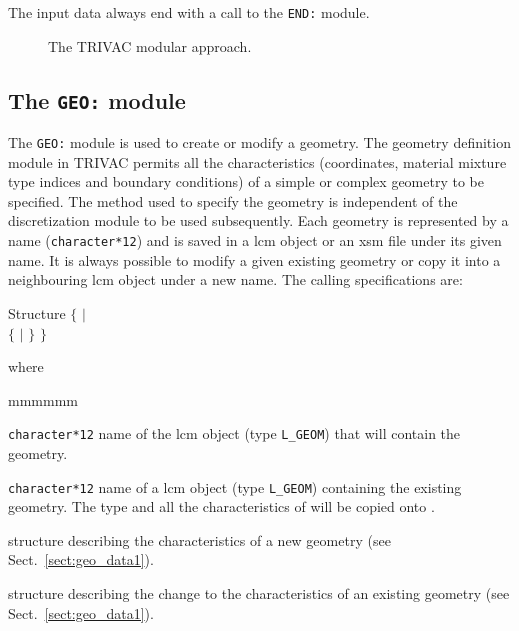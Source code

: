 \vskip 0.2cm

The input data always end with a call to the {\tt END:} module.

\begin{figure}[htbp]
\begin{center} 
\epsfxsize=16cm
\centerline{ }
\parbox{14cm}{\caption{The TRIVAC modular approach.}
\label{fig:trivac3}} 
\end{center} 
\end{figure}

\subsection{The {\tt GEO:} module}

The {\tt GEO:} module is used to create or modify a geometry. The geometry definition module in TRIVAC permits all the characteristics (coordinates, material mixture type indices and boundary conditions) of a simple or complex geometry to be specified. The method used to specify the geometry is independent of the discretization module to be used subsequently. Each geometry is represented by a name ({\tt character*12}) and is saved in a {\sc lcm} object or an {\sc xsm} file under its given name. It is always possible to modify a given existing geometry or copy it into a neighbouring {\sc lcm} object under a new name. The calling specifications are:

\begin{DataStructure}{Structure }
$\{$  \moc{:=}   $|$ \\
 \moc{:=}  $\{$  $|$  $\}$ \moc{::}  $\}$
\end{DataStructure}

\noindent

\noindent where
\begin{ListeDeDescription}{mmmmmm}

\item[\dusa{GEOM1}] {\tt character*12} name of the {\sc lcm} object (type {\tt L\_GEOM}) that will contain the geometry.

\item[\dusa{GEOM2}] {\tt character*12} name of a {\sc lcm} object (type {\tt L\_GEOM}) containing the existing geometry. The type and all the characteristics of  will be copied onto .

\item[\dstr{geo\_data1}] structure describing the characteristics of a new geometry (see Sect.~\ref{sect:geo_data1}).

\item[\dstr{geo\_data2}] structure describing the change to the characteristics of an existing geometry (see Sect.~\ref{sect:geo_data1}).

\end{ListeDeDescription}

